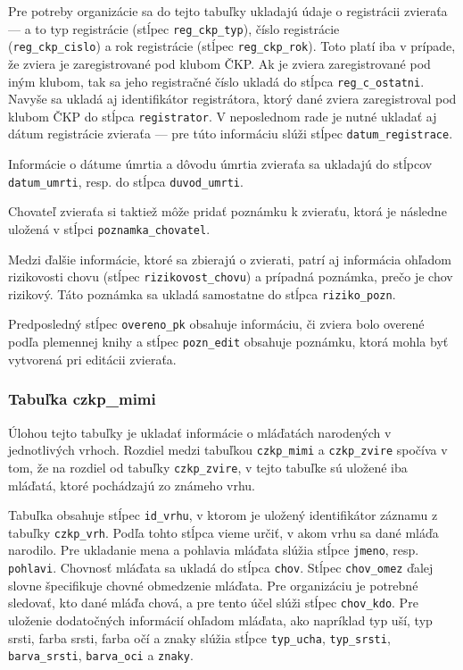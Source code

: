 Pre potreby organizácie sa do tejto tabuľky ukladajú údaje o registrácii zvieraťa ---  a to typ registrácie (stĺpec \texttt{reg_ckp_typ}), číslo registrácie\\ (\texttt{reg_ckp_cislo}) a rok registrácie (stĺpec \texttt{reg_ckp_rok}). Toto platí iba v prípade, že zviera je zaregistrované pod klubom ČKP. Ak je zviera zaregistrované pod iným klubom, tak sa jeho registračné číslo ukladá do stĺpca \texttt{reg_c_ostatni}. Navyše sa ukladá aj identifikátor registrátora, ktorý dané zviera zaregistroval pod klubom ČKP do stĺpca \texttt{registrator}. V neposlednom rade je nutné ukladať aj dátum registrácie zvieraťa --- pre túto informáciu slúži stĺpec \texttt{datum_registrace}.

Informácie o dátume úmrtia a dôvodu úmrtia zvieraťa sa ukladajú do stĺpcov \texttt{datum_umrti}, resp. do stĺpca \texttt{duvod_umrti}.

Chovateľ zvieraťa si taktiež môže pridať poznámku k zvieraťu, ktorá je následne uložená v stĺpci \texttt{poznamka_chovatel}.

Medzi ďalšie informácie, ktoré sa zbierajú o zvierati, patrí aj informácia ohľadom rizikovosti chovu (stĺpec \texttt{rizikovost_chovu}) a prípadná poznámka, prečo je chov rizikový. Táto poznámka sa ukladá samostatne do stĺpca \texttt{riziko_pozn}.

Predposledný stĺpec \texttt{overeno_pk} obsahuje informáciu, či zviera bolo overené podľa plemennej knihy a stĺpec \texttt{pozn_edit} obsahuje poznámku, ktorá mohla byť vytvorená pri editácii zvieraťa.

\subsubsection*{Tabuľka czkp\_mimi}

Úlohou tejto tabuľky je ukladať informácie o mláďatách narodených v jednotlivých vrhoch.
Rozdiel medzi tabuľkou \texttt{czkp_mimi} a \texttt{czkp_zvire} spočíva v tom, že na rozdiel od tabuľky \texttt{czkp_zvire}, v tejto tabuľke sú uložené iba mláďatá, ktoré pochádzajú zo známeho vrhu.

Tabuľka obsahuje stĺpec \texttt{id_vrhu}, v ktorom je uložený identifikátor záznamu z tabuľky \texttt{czkp_vrh}. Podľa tohto stĺpca vieme určiť, v akom vrhu sa dané mláďa narodilo. Pre ukladanie mena a pohlavia mláďata slúžia stĺpce \texttt{jmeno}, resp. \texttt{pohlavi}. Chovnosť mláďata sa ukladá do stĺpca \texttt{chov}. Stĺpec \texttt{chov_omez} ďalej slovne špecifikuje chovné obmedzenie mláďata. Pre organizáciu je potrebné sledovať, kto dané mláďa chová, a pre tento účel slúži stĺpec \texttt{chov_kdo}. Pre uloženie dodatočných informácií ohľadom mláďata, ako napríklad typ uší, typ srsti, farba srsti, farba očí a znaky slúžia stĺpce \texttt{typ_ucha}, \texttt{typ_srsti}, \texttt{barva_srsti}, \texttt{barva_oci} a \texttt{znaky}.


